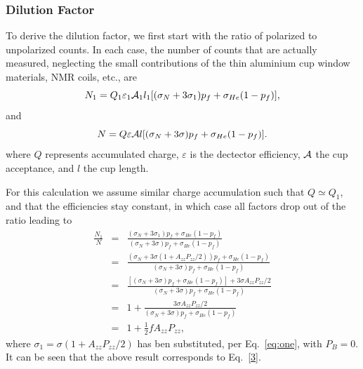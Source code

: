 

\subsubsection{Dilution Factor}
\label{dil}
To derive the dilution factor, we first start with the ratio of 
polarized to unpolarized counts.
In each case, the number of counts that are actually measured,  neglecting 
the small contributions of the thin aluminium cup window materials, NMR coils, etc.,
are
\begin{equation}
N_1=Q_1\varepsilon_1 {\cal A}_1 l_1[(\sigma_N+3\sigma_1)p_f+\sigma_{He}(1-p_f)],
\end{equation}
and
\begin{equation}
N=Q\varepsilon {\cal A}l[(\sigma_N+3\sigma)p_f+\sigma_{He}(1-p_f)].
\end{equation}
where $Q$ represents accumulated charge, $\varepsilon$ is the dectector 
efficiency, ${\cal A}$ the cup acceptance, and $l$ the cup length.  

For
this calculation we assume similar charge accumulation such that $Q\simeq Q_1$, 
and that the efficiencies stay constant, in which case all factors drop out of 
the ratio leading to
\begin{eqnarray}
\nonumber \frac{N_1}{N}& = &\frac{{(\sigma_N+3\sigma_1)p_f+\sigma_{He}(1-p_f)}
}{(\sigma_N+3\sigma)p_f+\sigma_{He}(1-p_f)}\\
\nonumber & = & \frac{{(\sigma_N+3\sigma(1+A_{zz}P_{zz}/2))p_f+\sigma_{He}(1-p_
f)}}{(\sigma_N+3\sigma)p_f+\sigma_{He}(1-p_f)}\\
\nonumber & = & \frac{{[(\sigma_N+3\sigma)p_f+\sigma_{He}(1-p_
f)]+3\sigma A_{zz}P_{zz}/2}}{(\sigma_N+3\sigma)p_f+\sigma_{He}(1-p_f)}\\
\nonumber & = & 1 + \frac{3\sigma 
A_{zz}P_{zz}/2}{(\sigma_N+3\sigma)p_f+\sigma_{He}(1-p_f)}\\
& = & 1 + \frac{1}{2} f A_{zz}P_{zz}, 
\end{eqnarray}
where $\sigma_1 = \sigma(1+A_{zz}P_{zz}/2)$ has ben substituted, per 
Eq.~\ref{eq:one}, with $P_B =0$. It can be seen that the above result 
corresponds to Eq.~\ref{3}.